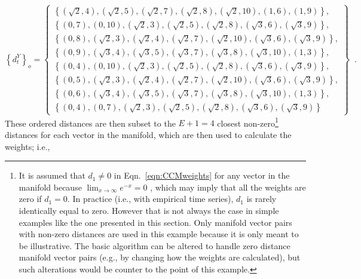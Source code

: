 \begin{equation}
\left\{d_{t}^Y\right\}_o = \left\{\begin{array}{c} 
\left\{\left(\sqrt{2},4\right),\left(\sqrt{2},5\right),\left(\sqrt{2},7\right),\left(\sqrt{2},8\right),\left(\sqrt{2},10\right),\left(1,6\right),\left(1,9\right)\right\},\\
\left\{\left(0,7\right),\left(0,10\right),\left(\sqrt{2},3\right),\left(\sqrt{2},5\right),\left(\sqrt{2},8\right),\left(\sqrt{3},6\right),\left(\sqrt{3},9\right)\right\},\\
\left\{\left(0,8\right),\left(\sqrt{2},3\right),\left(\sqrt{2},4\right),\left(\sqrt{2},7\right),\left(\sqrt{2},10\right),\left(\sqrt{3},6\right),\left(\sqrt{3},9\right)\right\},\\
\left\{\left(0,9\right),\left(\sqrt{3},4\right),\left(\sqrt{3},5\right),\left(\sqrt{3},7\right),\left(\sqrt{3},8\right),\left(\sqrt{3},10\right),\left(1,3\right)\right\},\\
\left\{\left(0,4\right),\left(0,10\right),\left(\sqrt{2},3\right),\left(\sqrt{2},5\right),\left(\sqrt{2},8\right),\left(\sqrt{3},6\right),\left(\sqrt{3},9\right)\right\},\\
\left\{\left(0,5\right),\left(\sqrt{2},3\right),\left(\sqrt{2},4\right),\left(\sqrt{2},7\right),\left(\sqrt{2},10\right),\left(\sqrt{3},6\right),\left(\sqrt{3},9\right)\right\},\\
\left\{\left(0,6\right),\left(\sqrt{3},4\right),\left(\sqrt{3},5\right),\left(\sqrt{3},7\right),\left(\sqrt{3},8\right),\left(\sqrt{3},10\right),\left(1,3\right)\right\},\\
\left\{\left(0,4\right),\left(0,7\right),\left(\sqrt{2},3\right),\left(\sqrt{2},5\right),\left(\sqrt{2},8\right),\left(\sqrt{3},6\right),\left(\sqrt{3},9\right)\right\}
\end{array}\right\}\;\;.
\end{equation}
These ordered distances are then subset to the $E+1=4$ closest non-zero\footnote{It is assumed that $d_1\neq 0$ in Eqn.\ \ref{eqn:CCMweights} for any vector in the manifold because $\lim_{x\rightarrow \infty}e^{-x} = 0$ \cite{statsbook_placeholder}, which may imply that all the weights are zero if $d_1=0$.  In practice (i.e., with empirical time series), $d_1$ is rarely identically equal to zero.  However that is not always the case in simple examples like the one presented in this section.  Only manifold vector pairs with non-zero distances are used in this example because it is only meant to be illustrative.  The basic algorithm can be altered to handle zero distance manifold vector pairs (e.g., by changing how the weights are calculated), but such alterations would be counter to the point of this example.} distances for each vector in the manifold, which are then used to calculate the weights; i.e.,
